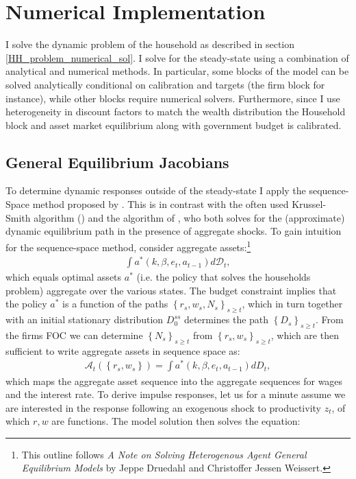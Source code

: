 \section{Numerical Implementation} \label{sec:SHADE_method}
I solve the dynamic problem of the household as described in section \ref{HH_problem_numerical_sol}. I solve for the steady-state using a combination of analytical and numerical methods. In particular, some blocks of the model can be solved analytically conditional on calibration and targets (the firm block for instance), while other blocks require numerical solvers. Furthermore, since I use heterogeneity in discount factors to match the wealth distribution the Household block and asset market equilibrium along with government budget is calibrated.    

\subsection{General Equilibrium Jacobians}
To determine dynamic responses outside of the steady-state I apply the sequence-Space method proposed by \citet{auclert2019using}. This is in contrast with the often used Krussel-Smith algorithm (\citet{krusell1998income}) and the algorithm of \citet{reiter2009solving}, who both solves for the (approximate) dynamic equilibrium path in the presence of aggregate shocks. To gain intuition for the sequence-space method, consider aggregate assets:\footnote{This outline follows \textit{A Note on Solving Heterogenous Agent General
Equilibrium Models} by Jeppe Druedahl and Christoffer Jessen Weissert.}
\begin{gather*}
\int a^{*}\left(k,\beta,e_{t},a_{t-1}\right)d  \mathcal{D}_{t},
\end{gather*}
which equals optimal assets $a^*$ (i.e. the policy that solves the households problem) aggregate over the various states. The budget constraint implies that the policy $a^*$ is a function of the paths $\left\{ r_{s},w_{s},N_{s}\right\} _{s\geq t}$, which in turn together with an initial stationary distribution $D_0^{ss}$ determines the path $\left\{ D_{s}\right\} _{s\geq t}$. From the firms FOC we can determine $\left\{ N_{s}\right\} _{s\geq t}$ from $\left\{ r_{s},w_{s}\right\} _{s\geq t}$, which are then sufficient to write aggregate assets in sequence space as: 
\begin{gather*}
\mathcal{A}_{t}\left(\left\{ r_{s},w_{s}\right\} \right)=\int a^{*}\left(k,\beta,e_{t},a_{t-1}\right)dD_{t},
\end{gather*}
which maps the aggregate asset sequence into the aggregate sequences for wages and the interest rate. To derive impulse responses, let us for a minute assume we are interested in the response following an exogenous shock to productivity $z_t$, of which $r,w$ are functions. The model solution then solves the equation: 
